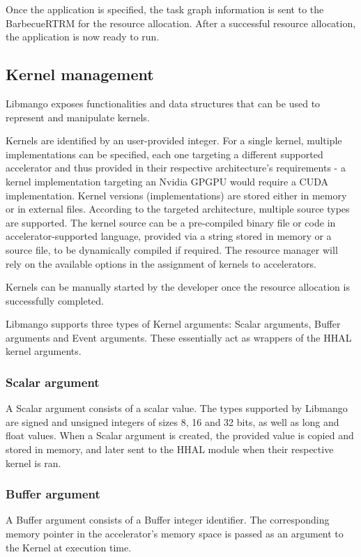 Once the application is specified, the task graph information is sent to the BarbecueRTRM for the resource allocation. After a successful resource allocation, the application is now ready to run.

\subsection{Kernel management} \label{Libmango:KernelManagement}
Libmango exposes functionalities and data structures that can be used to represent and manipulate kernels.

Kernels are identified by an user-provided integer. For a single kernel, multiple implementations can be specified, each one targeting a different supported accelerator and thus provided in their respective architecture's requirements - a kernel implementation targeting an Nvidia GPGPU would require a CUDA implementation.
Kernel versions (implementations) are stored either in memory or in external files. According to the targeted architecture, multiple source types are supported. The kernel source can be a pre-compiled binary file or code in accelerator-supported language, provided via a string stored in memory or a source file, to be dynamically compiled if required.
The resource manager will rely on the available options in the assignment of kernels to accelerators.

Kernels can be manually started by the developer once the resource allocation is successfully completed.

Libmango supports three types of Kernel arguments: Scalar arguments, Buffer arguments and Event arguments.
These essentially act as wrappers of the HHAL kernel arguments.

\subsubsection{Scalar argument}
A Scalar argument consists of a scalar value. The types supported by Libmango are signed and unsigned integers of sizes 8, 16 and 32 bits, as well as long and float values. 
When a Scalar argument is created, the provided value is copied and stored in memory, and later sent to the HHAL module when their respective kernel is ran. 

\subsubsection{Buffer argument}
A Buffer argument consists of a Buffer integer identifier. The corresponding memory pointer in the accelerator's memory space is passed as an argument to the Kernel at execution time.

